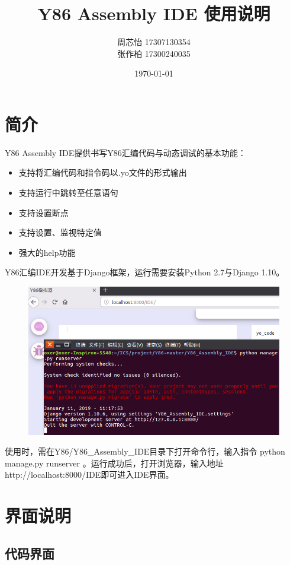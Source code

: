 \documentclass[12pt]{article} %
\title{\textbf{Y86 Assembly IDE 使用说明}}
\author{周芯怡 17307130354\\张作柏 17300240035}
\date{\today}
\begin{document}
\begin{sloppypar}
\maketitle

\section{简介}

Y86 Assembly IDE提供书写Y86汇编代码与动态调试的基本功能：
\begin{itemize}
\item 支持将汇编代码和指令码以.yo文件的形式输出
\item 支持运行中跳转至任意语句
\item 支持设置断点
\item 支持设置、监视特定值
\item 强大的help功能
\end{itemize}

Y86汇编IDE开发基于Django框架，运行需要安装Python 2.7与Django 1.10。

\begin{figure}[htbp]
\begin{center}
\includegraphics[width=.6\linewidth]{asset/1.png}
\end{center}
\end{figure}

使用时，需在Y86/Y86\_Assembly\_IDE目录下打开命令行，输入指令 python manage.py runserver 。运行成功后，打开浏览器，输入地址 http://localhost:8000/IDE即可进入IDE界面。

\clearpage
\section{界面说明}

\subsection{代码界面}


\end{sloppypar}
\end{document}
